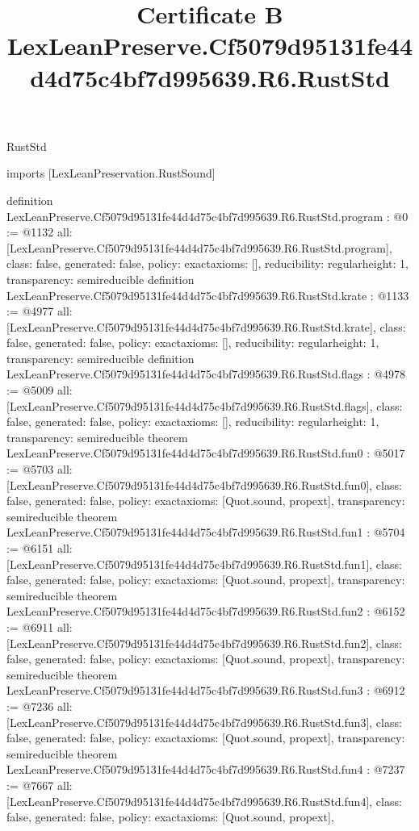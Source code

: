 \begin{lexlean}{RustStd}
\title{Certificate B LexLeanPreserve.Cf5079d95131fe44d4d75c4bf7d995639.R6.RustStd}
\begin{coremodule}
imports [LexLeanPreservation.RustSound]

definition LexLeanPreserve.Cf5079d95131fe44d4d75c4bf7d995639.R6.RustStd.program : @0 := @1132 {
  all: [LexLeanPreserve.Cf5079d95131fe44d4d75c4bf7d995639.R6.RustStd.program],
  class: false,
  generated: false,
  policy: exact{axioms: []},
  reducibility: regular{height: 1},
  transparency: semireducible
}
definition LexLeanPreserve.Cf5079d95131fe44d4d75c4bf7d995639.R6.RustStd.krate : @1133 := @4977 {
  all: [LexLeanPreserve.Cf5079d95131fe44d4d75c4bf7d995639.R6.RustStd.krate],
  class: false,
  generated: false,
  policy: exact{axioms: []},
  reducibility: regular{height: 1},
  transparency: semireducible
}
definition LexLeanPreserve.Cf5079d95131fe44d4d75c4bf7d995639.R6.RustStd.flags : @4978 := @5009 {
  all: [LexLeanPreserve.Cf5079d95131fe44d4d75c4bf7d995639.R6.RustStd.flags],
  class: false,
  generated: false,
  policy: exact{axioms: []},
  reducibility: regular{height: 1},
  transparency: semireducible
}
theorem LexLeanPreserve.Cf5079d95131fe44d4d75c4bf7d995639.R6.RustStd.fun0 : @5017 := @5703 {
  all: [LexLeanPreserve.Cf5079d95131fe44d4d75c4bf7d995639.R6.RustStd.fun0],
  class: false,
  generated: false,
  policy: exact{axioms: [Quot.sound, propext]},
  transparency: semireducible
}
theorem LexLeanPreserve.Cf5079d95131fe44d4d75c4bf7d995639.R6.RustStd.fun1 : @5704 := @6151 {
  all: [LexLeanPreserve.Cf5079d95131fe44d4d75c4bf7d995639.R6.RustStd.fun1],
  class: false,
  generated: false,
  policy: exact{axioms: [Quot.sound, propext]},
  transparency: semireducible
}
theorem LexLeanPreserve.Cf5079d95131fe44d4d75c4bf7d995639.R6.RustStd.fun2 : @6152 := @6911 {
  all: [LexLeanPreserve.Cf5079d95131fe44d4d75c4bf7d995639.R6.RustStd.fun2],
  class: false,
  generated: false,
  policy: exact{axioms: [Quot.sound, propext]},
  transparency: semireducible
}
theorem LexLeanPreserve.Cf5079d95131fe44d4d75c4bf7d995639.R6.RustStd.fun3 : @6912 := @7236 {
  all: [LexLeanPreserve.Cf5079d95131fe44d4d75c4bf7d995639.R6.RustStd.fun3],
  class: false,
  generated: false,
  policy: exact{axioms: [Quot.sound, propext]},
  transparency: semireducible
}
theorem LexLeanPreserve.Cf5079d95131fe44d4d75c4bf7d995639.R6.RustStd.fun4 : @7237 := @7667 {
  all: [LexLeanPreserve.Cf5079d95131fe44d4d75c4bf7d995639.R6.RustStd.fun4],
  class: false,
  generated: false,
  policy: exact{axioms: [Quot.sound, propext]},
}
\end{coremodule}
\end{lexlean}
